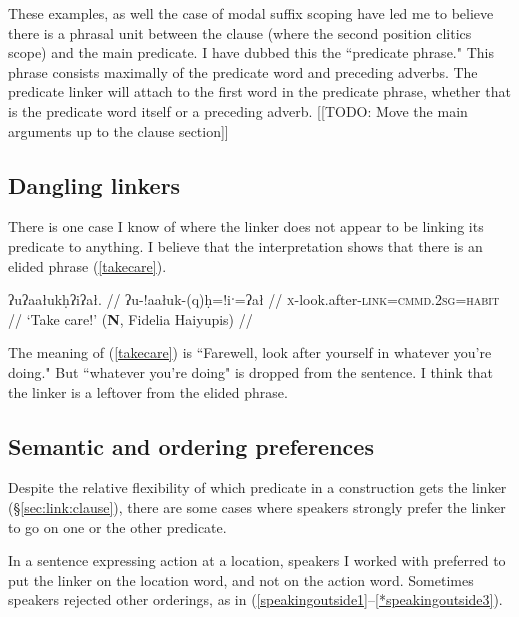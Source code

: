 
These examples, as well the case of modal suffix scoping have led me to believe there is a phrasal unit between the clause (where the second position clitics scope) and the main predicate. I have dubbed this the ``predicate phrase." This phrase consists maximally of the predicate word and preceding adverbs. The predicate linker will attach to the first word in the predicate phrase, whether that is the predicate word itself or a preceding adverb. [[TODO: Move the main arguments up to the clause section]]

\subsection{Dangling linkers} \label{sec:link:dangling}

There is one case I know of where the linker does not appear to be linking its predicate to anything. I believe that the interpretation shows that there is an elided phrase (\ref{takecare}).

\ex \label{takecare}
\begingl
\glpreamble ʔuʔaałukḥʔiʔał. //
\gla ʔu-!aałuk-(q)ḥ=!iˑ=ʔał //
\glb \textsc{x}-look.after-\textsc{link}=\textsc{cmmd.2sg}=\textsc{habit} //
\glft `Take care!' (\textbf{N}, Fidelia Haiyupis) //
\endgl
\xe

The meaning of (\ref{takecare}) is ``Farewell, look after yourself in whatever you're doing." But ``whatever you're doing" is dropped from the sentence. I think that the linker is a leftover from the elided phrase. %

\subsection{Semantic and ordering preferences} \label{sec:link:preferences}

Despite the relative flexibility of which predicate in a construction gets the linker (\S\ref{sec:link:clause}), there are some cases where speakers strongly prefer the linker to go on one or the other predicate.

In a sentence expressing action at a location, speakers I worked with preferred to put the linker on the location word, and not on the action word. Sometimes speakers rejected other orderings, as in (\ref{speakingoutside1}--\ref{*speakingoutside3}).


